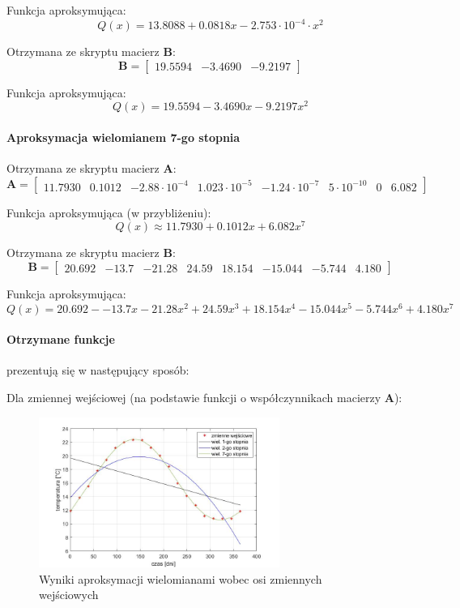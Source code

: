 \documentclass[a4paper, 12pt]{mwart}
\begin{document}
					Funkcja aproksymująca: 
					$$ Q(x) = 13.8088 + 0.0818x -2.753 \cdot 10^{-4} \cdot x^2 $$

					Otrzymana ze skryptu macierz $\textbf{B}$:
					$$\textbf{B} = \begin{bmatrix}
						19.5594 &
						-3.4690 &
						-9.2197
					\end{bmatrix}$$

					Funkcja aproksymująca:
					$$ Q(x) = 19.5594 -3.4690x -9.2197x^2$$

				\paragraph{Aproksymacja wielomianem 7-go stopnia}

					Otrzymana ze skryptu macierz $\textbf{A}$:
					$$\textbf{A} = \begin{bmatrix}
						11.7930 &
						0.1012 &
						-2.88\cdot 10^{-4} &
						1.023\cdot 10^{-5} &
						-1.24\cdot 10^{-7} &
						5 \cdot 10^{-10} &
						0 &
						6.082
					\end{bmatrix}$$

					Funkcja aproksymująca (w przybliżeniu):
					$$ Q(x) \approx 11.7930 + 0.1012x + 6.082 x^7 $$

					Otrzymana ze skryptu macierz $\textbf{B}$:
					$$\textbf{B} = \begin{bmatrix}
						20.692 &
						-13.7 &
						-21.28 &
						24.59 &
						18.154 &
						-15.044 &
						-5.744 &
						4.180
					\end{bmatrix}$$

					Funkcja aproksymująca:
					$$ Q(x) = 20.692 - -13.7x -21.28x^2 + 24.59x^3 + 18.154x^4 - 15.044x^5 -5.744x^6 + 4.180x^7 $$

					\newpage
				\paragraph{Otrzymane funkcje} prezentują się w następujący sposób:

					Dla zmiennej wejściowej (na podstawie funkcji o współczynnikach macierzy $\textbf{A}$):
					\begin{figure}[h]
						\begin{center}
							\includegraphics[width = 0.7\textwidth]{graphs/3-n.jpg}
							\caption{Wyniki aproksymacji wielomianami wobec osi zmiennych wejściowych}
							\label{fig:3N}
						\end{center}
					\end{figure}
\end{document}
